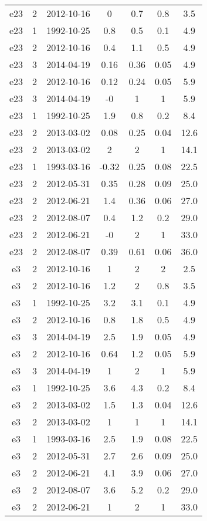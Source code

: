 \begin{table*}[htp]
\begin{tabular}{ccccccc}
e23 & 2 & 2012-10-16 & 0 & 0.7 & 0.8 & 3.5 \\
e23 & 1 & 1992-10-25 & 0.8 & 0.5 & 0.1 & 4.9 \\
e23 & 2 & 2012-10-16 & 0.4 & 1.1 & 0.5 & 4.9 \\
e23 & 3 & 2014-04-19 & 0.16 & 0.36 & 0.05 & 4.9 \\
e23 & 2 & 2012-10-16 & 0.12 & 0.24 & 0.05 & 5.9 \\
e23 & 3 & 2014-04-19 & -0 & 1 & 1 & 5.9 \\
e23 & 1 & 1992-10-25 & 1.9 & 0.8 & 0.2 & 8.4 \\
e23 & 2 & 2013-03-02 & 0.08 & 0.25 & 0.04 & 12.6 \\
e23 & 2 & 2013-03-02 & 2 & 2 & 1 & 14.1 \\
e23 & 1 & 1993-03-16 & -0.32 & 0.25 & 0.08 & 22.5 \\
e23 & 2 & 2012-05-31 & 0.35 & 0.28 & 0.09 & 25.0 \\
e23 & 2 & 2012-06-21 & 1.4 & 0.36 & 0.06 & 27.0 \\
e23 & 2 & 2012-08-07 & 0.4 & 1.2 & 0.2 & 29.0 \\
e23 & 2 & 2012-06-21 & -0 & 2 & 1 & 33.0 \\
e23 & 2 & 2012-08-07 & 0.39 & 0.61 & 0.06 & 36.0 \\
e3 & 2 & 2012-10-16 & 1 & 2 & 2 & 2.5 \\
e3 & 2 & 2012-10-16 & 1.2 & 2 & 0.8 & 3.5 \\
e3 & 1 & 1992-10-25 & 3.2 & 3.1 & 0.1 & 4.9 \\
e3 & 2 & 2012-10-16 & 0.8 & 1.8 & 0.5 & 4.9 \\
e3 & 3 & 2014-04-19 & 2.5 & 1.9 & 0.05 & 4.9 \\
e3 & 2 & 2012-10-16 & 0.64 & 1.2 & 0.05 & 5.9 \\
e3 & 3 & 2014-04-19 & 1 & 2 & 1 & 5.9 \\
e3 & 1 & 1992-10-25 & 3.6 & 4.3 & 0.2 & 8.4 \\
e3 & 2 & 2013-03-02 & 1.5 & 1.3 & 0.04 & 12.6 \\
e3 & 2 & 2013-03-02 & 1 & 1 & 1 & 14.1 \\
e3 & 1 & 1993-03-16 & 2.5 & 1.9 & 0.08 & 22.5 \\
e3 & 2 & 2012-05-31 & 2.7 & 2.6 & 0.09 & 25.0 \\
e3 & 2 & 2012-06-21 & 4.1 & 3.9 & 0.06 & 27.0 \\
e3 & 2 & 2012-08-07 & 3.6 & 5.2 & 0.2 & 29.0 \\
e3 & 2 & 2012-06-21 & 1 & 2 & 1 & 33.0 \\

\end{tabular}
\end{table*}
